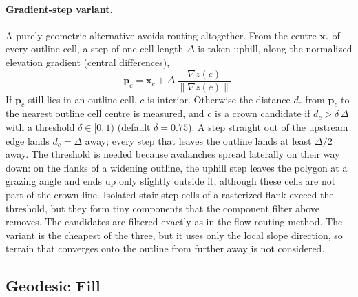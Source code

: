 \paragraph{Gradient-step variant.}
A purely geometric alternative avoids routing altogether. From the centre
$\mathbf{x}_c$ of every outline cell, a step of one cell length $\Delta$ is
taken uphill, along the normalized elevation gradient (central differences),
\begin{equation}
  \mathbf{p}_c = \mathbf{x}_c + \Delta \, \frac{\nabla z(c)}{\lVert \nabla z(c) \rVert} .
  \label{eq:gradient_step}
\end{equation}
If $\mathbf{p}_c$ still lies in an outline cell, $c$ is interior. Otherwise the
distance $d_c$ from $\mathbf{p}_c$ to the nearest outline cell centre is
measured, and $c$ is a crown candidate if $d_c > \delta\,\Delta$ with a
threshold $\delta \in [0, 1)$ (default $\delta = 0.75$). A step straight
out of the upstream edge lands $d_c = \Delta$ away; every step that leaves the
outline lands at least $\Delta/2$ away. The threshold is needed because
avalanches spread laterally on their way down: on the flanks of a widening
outline, the uphill step leaves the polygon at a grazing angle and ends up only
slightly outside it, although these cells are not part of the crown line.
Isolated stair-step cells of a rasterized flank exceed the threshold, but they
form tiny components that the component filter above removes. The candidates
are filtered exactly as in the flow-routing method. The variant is the cheapest
of the three, but it uses only the local slope direction, so terrain that
converges onto the outline from further away is not considered.

\subsection{Geodesic Fill}
\label{sec:geodesic_fill}

